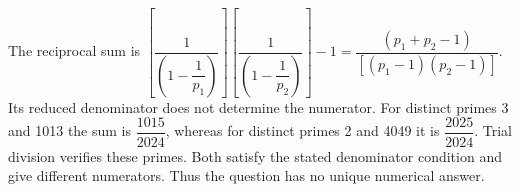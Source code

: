 The reciprocal sum is $[\dfrac{1}{(1-\dfrac{1}{p_1})}][\dfrac{1}{(1-\dfrac{1}{p_2})}]-1=\dfrac{(p_1+p_2-1)}{[(p_1-1)(p_2-1)]}$. Its reduced denominator does not determine the numerator. For distinct primes 3 and 1013 the sum is $\dfrac{1015}{2024}$, whereas for distinct primes 2 and 4049 it is $\dfrac{2025}{2024}$. Trial division verifies these primes. Both satisfy the stated denominator condition and give different numerators. Thus the question has no unique numerical answer.
